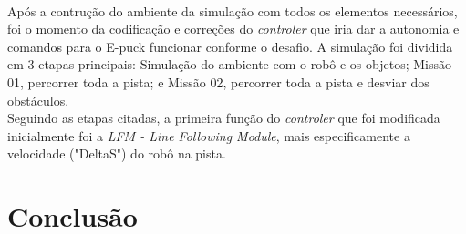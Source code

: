 \documentclass[11pt, a4paper, twocolumn]{article}
\begin{document}
    \\
    Após a contrução do ambiente da simulação com todos os elementos necessários, foi o momento da codificação e correções do \textit{controler} que iria dar a autonomia e comandos para o E-puck funcionar 
    conforme o desafio. A simulação foi dividida em 3 etapas principais: Simulação do ambiente com o robô e os objetos; Missão 01, percorrer toda a pista; e Missão 02, percorrer toda a pista e desviar dos 
    obstáculos.
    \\
    Seguindo as etapas citadas, a primeira função do \textit{controler} que foi modificada inicialmente foi a \textit{LFM - Line Following Module}, mais especificamente a velocidade ("DeltaS") do robô na 
    pista.

    \section{Conclusão}
\end{document}
